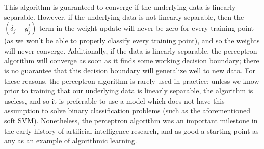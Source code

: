 \documentclass{article}
\begin{document}
\noindent This algorithm is guaranteed to converge if the underlying data is linearly separable. However, if the underlying data is not linearly separable, then the $(\delta_j - y_j^t)$ term in the weight update will never be zero for every training point (as we won't be able to properly classify every training point), and so the weights will never converge. Additionally, if the data is linearly separable, the perceptron algorithm will converge as soon as it finds some working decision boundary; there is no guarantee that this decision boundary will generalize well to new data. For these reasons, the perceptron algorithm is rarely used in practice; unless we know prior to training that our underlying data is linearly separable, the algorithm is useless, and so it is preferable to use a model which does not have this assumption to solve binary classification problems (such as the aforementioned soft SVM). Nonetheless, the perceptron algorithm was an important milestone in the early history of artificial intelligence research, and as good a starting point as any as an example of algorithmic learning. 
\end{document}
